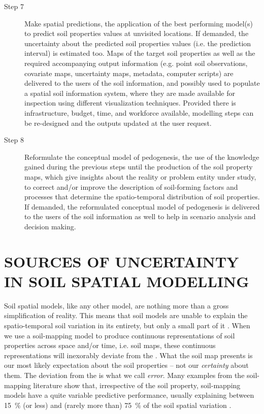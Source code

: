 \begin{description}
\item[Step 7] Make spatial predictions, the application of the best performing
model(s) to predict soil properties values at unvisited locations. If demanded, the uncertainty
about the predicted soil properties values (i.e. the prediction interval) is estimated too.
Maps of the target soil properties as well as the required accompanying output information
(e.g. point soil observations, covariate maps, uncertainty maps, metadata, computer scripts)
are delivered to the users of the soil information, and possibly used to populate a spatial soil
information system, where they are made available for inspection using different visualization
techniques. Provided there is infrastructure, budget, time, and workforce available, modelling
steps can be re-designed and the outputs updated at the user request.

\item[Step 8] Reformulate the conceptual model of pedogenesis, the use
of the knowledge gained during the previous steps until the production of the soil property
maps, which give insights about the reality or problem entity under study, to correct
and/or improve the description of soil-forming factors and processes that determine the
spatio-temporal distribution of soil properties. If demanded, the reformulated conceptual model
of pedogenesis is delivered to the users of the soil information as well to help in scenario analysis
and decision making.
\end{description}

\section{SOURCES OF UNCERTAINTY IN SOIL SPATIAL MODELLING}

Soil spatial models, like any other model, are nothing more than a gross simplification of reality.
This means that soil models are unable to explain the spatio-temporal soil variation in
its entirety, but only a small part of it \cite{Heuvelink1998a, Legros2006}. When we use a
soil-mapping model to produce continuous representations of soil properties across space and/or time,
i.e. soil maps, these continuous representations will inexorably deviate from the . What
the soil map presents is our most likely expectation about the soil properties -- not our
\emph{certainty} about them. The deviation from the  is what we call \emph{error}. Many
examples from the soil-mapping literature show that, irrespective of the soil property, soil-mapping
models have a quite variable predictive performance, usually explaining between \SI{15}{\percent}
(or less) and (rarely more than) \SI{75}{\percent} of the soil spatial variation
\cite{MooreEtAl1993, OdehEtAl1994, GesslerEtAl1995, McKenzieEtAl1999, GobinEtAl2001, 
SumflethEtAl2008, SunEtAl2012, ViscarraRosselEtAl2013, NussbaumEtAl2014, HenglEtAl2015,
 GaschEtAl2015, HeungEtAl2016}.

